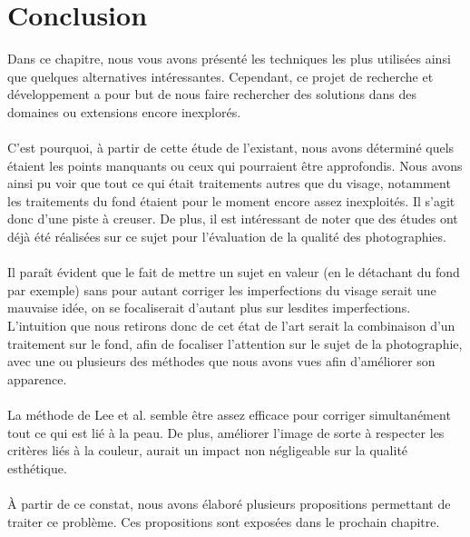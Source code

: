 \documentclass[11pt, french,screen]{report-rd-info}
\begin{document}
\newpage
\section{Conclusion}
Dans ce chapitre, nous vous avons présenté les techniques les plus utilisées ainsi que quelques alternatives intéressantes. Cependant, ce projet de recherche et développement a pour but de nous faire rechercher des solutions dans des domaines ou extensions encore inexplorés.
\paragraph*{}
C’est pourquoi, à partir de cette étude de l’existant, nous avons déterminé quels étaient les points manquants ou ceux qui pourraient être approfondis. Nous avons ainsi pu voir que tout ce qui était traitements autres que du visage, notamment les traitements du fond étaient pour le moment encore assez inexploités. Il s’agit donc d’une piste à creuser. De plus, il est intéressant de noter que des études ont déjà été réalisées sur ce sujet pour l’évaluation de la qualité des photographies.
\paragraph*{}
Il paraît évident que le fait de mettre un sujet en valeur (en le détachant du fond par exemple) sans pour autant corriger les imperfections du visage serait une mauvaise idée, on se focaliserait d’autant plus sur lesdites imperfections. L’intuition que nous retirons donc de cet état de l’art serait la combinaison d’un traitement sur le fond, afin de focaliser l’attention sur le sujet de la photographie, avec une ou plusieurs des méthodes que nous avons vues afin d’améliorer son apparence. 
\paragraph*{}
La méthode de Lee et al. \cite{Lee} semble être assez efficace pour corriger simultanément tout ce qui est lié à la peau. De plus, améliorer l'image de sorte à respecter les critères liés à la couleur, aurait un impact non négligeable sur la qualité esthétique. 
\paragraph*{}
À partir de ce constat, nous avons élaboré plusieurs propositions permettant de traiter ce problème. Ces propositions sont exposées dans le prochain chapitre.
\end{document}
